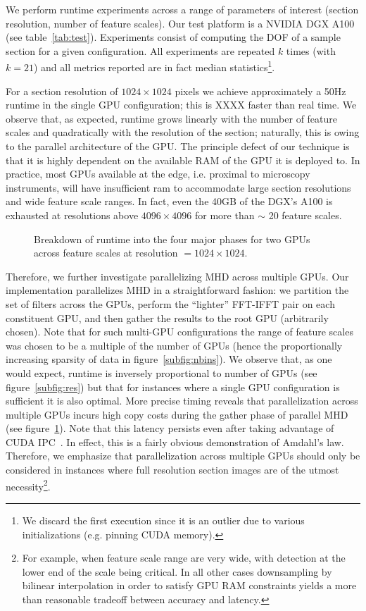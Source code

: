 \documentclass[sigconf,nonacm]{acmart}
\begin{document}
We perform runtime experiments across a range of parameters of interest (section resolution, number of feature scales).
Our test platform is a NVIDIA DGX A100 (see table~\ref{tab:test}).
Experiments consist of computing the DOF of a sample section for a given configuration.
All experiments are repeated $k$ times (with $k=21$) and all metrics reported are in fact median statistics\footnote{We discard the first execution since it is an outlier due to various initializations (e.g. pinning CUDA memory).}.

For a section resolution of $1024 \times 1024$ pixels we achieve approximately a 50Hz runtime in the single GPU configuration; this is XXXX faster than real time.
We observe that, as expected, runtime grows linearly with the number of feature scales and quadratically with the resolution of the section; naturally, this is owing to the parallel architecture of the GPU.
The principle defect of our technique is that it is highly dependent on the available RAM of the GPU it is deployed to.
In practice, most GPUs available at the edge, i.e. proximal to microscopy instruments, will have insufficient ram to accommodate large section resolutions and wide feature scale ranges.
In fact, even the 40GB of the DGX's A100 is exhausted at resolutions above $4096 \times 4096$ for more than $\sim$ 20 feature scales.

\begin{figure}
    \centering
    
    \caption{Breakdown of runtime into the four major phases for two GPUs across feature scales at resolution $=1024 \times 1024$.}
    \label{fig:stacked}
\end{figure}

Therefore, we further investigate parallelizing MHD across multiple GPUs.
Our implementation parallelizes MHD in a straightforward fashion: we partition the set of filters across the GPUs, perform the ``lighter'' FFT-IFFT pair on each constituent GPU, and then gather the results to the root GPU (arbitrarily chosen).
Note that for such multi-GPU configurations the range of feature scales was chosen to be a multiple of the number of GPUs (hence the proportionally increasing sparsity of data in figure~\ref{subfig:nbins}).
We observe that, as one would expect, runtime is inversely proportional to number of GPUs (see figure~\ref{subfig:res}) but that for instances where a single GPU configuration is sufficient it is also optimal.
More precise timing reveals that parallelization across multiple GPUs incurs high copy costs during the gather phase of parallel MHD (see figure~\ref{fig:stacked}).
Note that this latency persists even after taking advantage of CUDA IPC~\cite{6270863}.
In effect, this is a fairly obvious demonstration of Amdahl's law.
Therefore, we emphasize that parallelization across multiple GPUs should only be considered in instances where full resolution section images are of the utmost necessity\footnote{For example, when feature scale range are very wide, with detection at the lower end of the scale being critical. In all other cases downsampling by bilinear interpolation in order to satisfy GPU RAM constraints yields a more than reasonable tradeoff between accuracy and latency.}.
\end{document}
